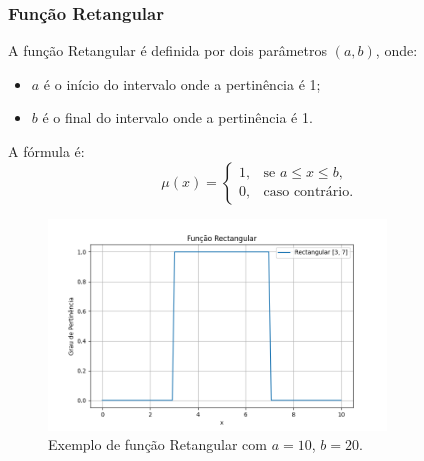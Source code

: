 \documentclass[a4paper,12pt]{article}
\begin{document}
\subsubsection{Função Retangular}
A função Retangular é definida por dois parâmetros $(a, b)$, onde:
\begin{itemize}
    \item $a$ é o início do intervalo onde a pertinência é 1;
    \item $b$ é o final do intervalo onde a pertinência é 1.
\end{itemize}
A fórmula é:
\[
\mu(x) =
\begin{cases}
1, & \text{se } a \leq x \leq b, \\
0, & \text{caso contrário.}
\end{cases}
\]
\begin{figure}[H]
    \centering
    \includegraphics[width=0.8\textwidth]{img/rectangular.png}
    \caption{Exemplo de função Retangular com $a=10$, $b=20$.}
\end{figure}
\end{document}
